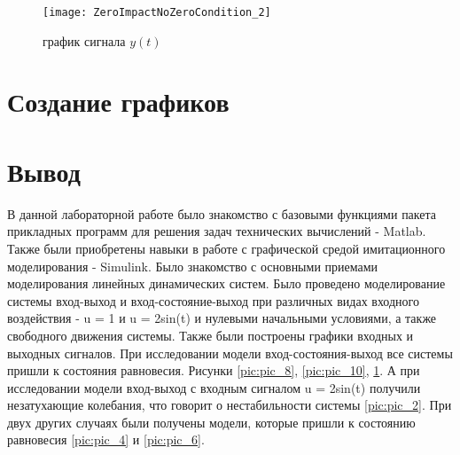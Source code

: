 \begin{figure}[H]
	\begin{center}
		\texttt{[image: ZeroImpactNoZeroCondition\_2]}
		\caption{график сигнала $y(t)$}
		\label{pic:pic_12} %
	\end{center}
\end{figure}


\section{Создание графиков}


\parindent=1cm %

\newpage

\section{Вывод}
В данной лабораторной работе было знакомство с базовыми функциями пакета прикладных программ для решения задач технических вычислений - Matlab. Также были приобретены навыки в работе с графической средой имитационного моделирования - Simulink. Было знакомство с основными приемами моделирования линейных динамических систем. Было проведено моделирование системы вход-выход и вход-состояние-выход при различных видах входного воздействия - u = 1 и u = 2sin(t) и нулевыми начальными условиями, а также свободного движения системы. Также были построены графики входных и выходных сигналов. При исследовании модели вход-состояния-выход все системы пришли к состояния равновесия. Рисунки \ref{pic:pic_8}, \ref{pic:pic_10}, \ref{pic:pic_12}. А при исследовании модели вход-выход с входным сигналом u = 2sin(t) получили незатухающие колебания, что говорит о нестабильности системы \ref{pic:pic_2}. При двух других случаях были получены модели, которые пришли к состоянию равновесия \ref{pic:pic_4} и \ref{pic:pic_6}.

